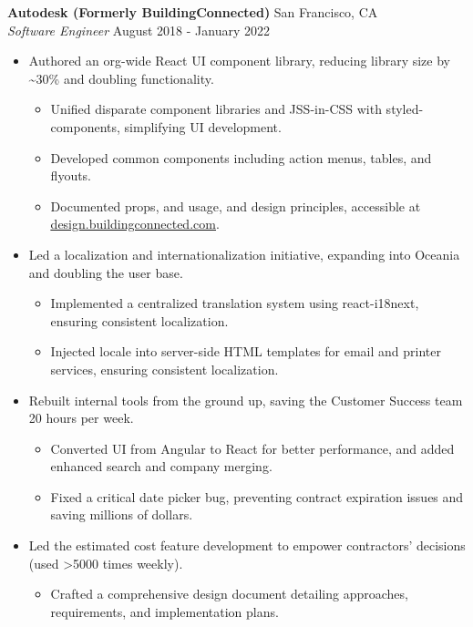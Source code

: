\documentclass[a4paper]{article}
\begin{document}
\textbf{Autodesk (Formerly BuildingConnected)} \hfill San Francisco, CA\\
\textit{Software Engineer} \hfill August 2018 - January 2022\\
\vspace{-1mm}
\begin{itemize} \itemsep .5pt
    \item Authored an org-wide React UI component library, reducing library size by \textasciitilde{}30\% and doubling functionality.
    \begin{itemize} \itemsep .5pt
        \item Unified disparate component libraries and JSS-in-CSS with styled-components, simplifying UI development.
        \item Developed common components including action menus, tables, and flyouts.
        \item Documented props, and usage, and design principles, accessible at \href{https://design.buildingconnected.com/}{\underline{design.buildingconnected.com}}.
    \end{itemize}
    \item Led a localization and internationalization initiative, expanding into Oceania and doubling the user base.
    \begin{itemize} \itemsep .5pt
        \item Implemented a centralized translation system using react-i18next, ensuring consistent localization.
        \item Injected locale into server-side HTML templates for email and printer services, ensuring consistent localization.  
    \end{itemize}
    \item Rebuilt internal tools from the ground up, saving the Customer Success team 20 hours per week.
    \begin{itemize} \itemsep .5pt
        \item Converted UI from Angular to React for better performance, and added enhanced search and company merging.
        \item Fixed a critical date picker bug, preventing contract expiration issues and saving millions of dollars.
    \end{itemize}
    \item Led the estimated cost feature development to empower contractors' decisions (used >5000 times weekly).
    \begin{itemize} \itemsep .5pt
        \item Crafted a comprehensive design document detailing approaches, requirements, and implementation plans.

\end{itemize}
\end{itemize}
\end{document}
